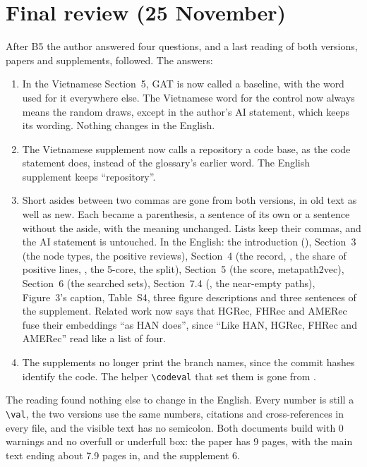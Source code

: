 \documentclass[11pt,a4paper]{article}
\DeclareRobustCommand{\code}[1]{\texttt{\detokenize{#1}}}
\begin{document}
\section{Final review (25 November)}\label{sec:final}

After B5 the author answered four questions, and a last reading of both versions, papers and
supplements, followed. The answers:
\begin{enumerate}
  \item In the Vietnamese Section~5, GAT is now called a baseline, with the word used for it
        everywhere else. The Vietnamese word for the control now always means the random draws,
        except in the author's AI statement, which keeps its wording. Nothing changes in the
        English.
  \item The Vietnamese supplement now calls a repository a code base, as the code statement
        does, instead of the glossary's earlier word. The English supplement keeps
        ``repository''.
  \item Short asides between two commas are gone from both versions, in old text as well as
        new. Each became a parenthesis, a sentence of its own or a sentence without the aside,
        with the meaning unchanged. Lists keep their commas, and the AI statement is untouched.
        In the English: the introduction (\code{PUP}), Section~3 (the node types, the positive
        reviews), Section~4 (the record, \code{PUP}, the share of positive lines, \code{PCCCP},
        the 5-core, the split), Section~5 (the score, metapath2vec), Section~6 (the searched
        sets), Section~7.4 (\code{PUPUP}, the near-empty paths), Figure~3's caption, Table~S4,
        three figure descriptions and three sentences of the supplement. Related work now says
        that HGRec, FHRec and AMERec fuse their embeddings ``as HAN does'', since ``Like HAN,
        HGRec, FHRec and AMERec'' read like a list of four.
  \item The supplements no longer print the branch names, since the commit hashes identify the
        code. The helper \verb|\codeval| that set them is gone from \code{supplement_v2.tex}.
\end{enumerate}
The reading found nothing else to change in the English. Every number is still a \verb|\val|,
the two versions use the same numbers, citations and cross-references in every file, and the
visible text has no semicolon. Both documents build with 0 warnings and no overfull or underfull
box: the paper has 9 pages, with the main text ending about 7.9 pages in, and the supplement 6.
\end{document}
